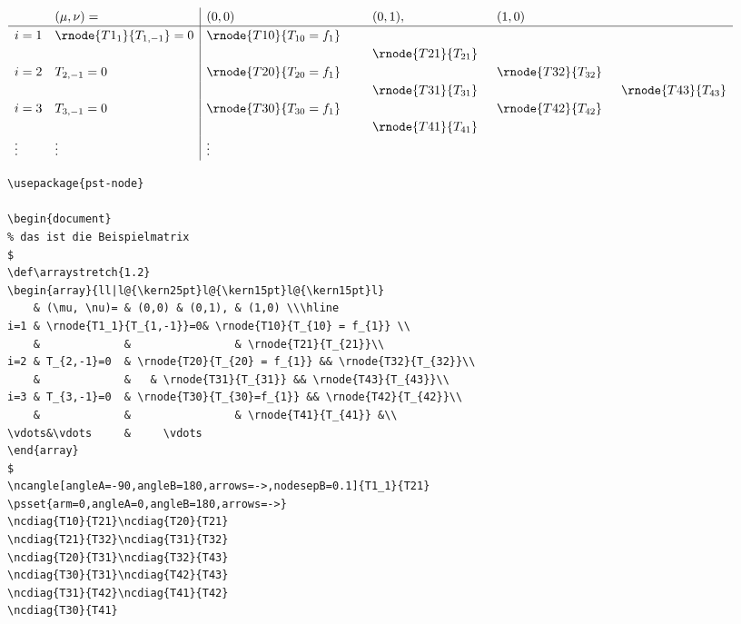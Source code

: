 \documentclass[12pt,a4paper]{article}
\begin{document}
$
\def\arraystretch{1.2}
\begin{array}{ll|l@{\kern25pt}l@{\kern15pt}l@{\kern15pt}l}
    & (\mu, \nu)= & (0,0) & (0,1), & (1,0) \\\hline
i=1 & \rnode{T1_1}{T_{1,-1}}=0& \rnode{T10}{T_{10} = f_{1}} \\
    &             &                & \rnode{T21}{T_{21}}\\
i=2 & T_{2,-1}=0  & \rnode{T20}{T_{20} = f_{1}} && \rnode{T32}{T_{32}}\\
    &             &   & \rnode{T31}{T_{31}} && \rnode{T43}{T_{43}}\\
i=3 & T_{3,-1}=0  & \rnode{T30}{T_{30}=f_{1}} && \rnode{T42}{T_{42}}\\
    &             &                & \rnode{T41}{T_{41}} &\\
\vdots&\vdots     &     \vdots 
\end{array}
$

\small
\begin{verbatim}
\usepackage{pst-node}

\begin{document}
% das ist die Beispielmatrix
$
\def\arraystretch{1.2}
\begin{array}{ll|l@{\kern25pt}l@{\kern15pt}l@{\kern15pt}l}
    & (\mu, \nu)= & (0,0) & (0,1), & (1,0) \\\hline
i=1 & \rnode{T1_1}{T_{1,-1}}=0& \rnode{T10}{T_{10} = f_{1}} \\
    &             &                & \rnode{T21}{T_{21}}\\
i=2 & T_{2,-1}=0  & \rnode{T20}{T_{20} = f_{1}} && \rnode{T32}{T_{32}}\\
    &             &   & \rnode{T31}{T_{31}} && \rnode{T43}{T_{43}}\\
i=3 & T_{3,-1}=0  & \rnode{T30}{T_{30}=f_{1}} && \rnode{T42}{T_{42}}\\
    &             &                & \rnode{T41}{T_{41}} &\\
\vdots&\vdots     &     \vdots 
\end{array}
$
\ncangle[angleA=-90,angleB=180,arrows=->,nodesepB=0.1]{T1_1}{T21}
\psset{arm=0,angleA=0,angleB=180,arrows=->}
\ncdiag{T10}{T21}\ncdiag{T20}{T21}
\ncdiag{T21}{T32}\ncdiag{T31}{T32}
\ncdiag{T20}{T31}\ncdiag{T32}{T43}
\ncdiag{T30}{T31}\ncdiag{T42}{T43}
\ncdiag{T31}{T42}\ncdiag{T41}{T42}
\ncdiag{T30}{T41}
\end{verbatim}
\end{document}
